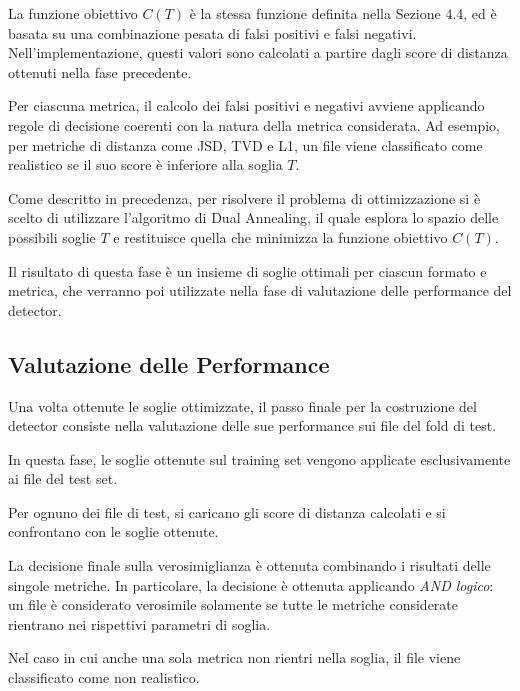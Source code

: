 \documentclass{report}
\begin{document}
La funzione obiettivo \(C(T)\) è la stessa funzione definita nella Sezione 4.4, ed è basata su una combinazione 
pesata di falsi positivi e falsi negativi. Nell'implementazione, questi valori sono calcolati 
a partire dagli score di distanza ottenuti nella fase precedente.

\bigskip

Per ciascuna metrica, il calcolo dei falsi positivi e negativi avviene applicando regole di decisione 
coerenti con la natura della metrica considerata. Ad esempio, per metriche di distanza come JSD, TVD e L1,
un file viene classificato come realistico se il suo score è inferiore alla soglia \(T\).

\bigskip

Come descritto in precedenza, per risolvere il problema di ottimizzazione si è scelto di utilizzare l'algoritmo di Dual Annealing,
il quale esplora lo spazio delle possibili soglie \(T\) e restituisce quella che minimizza la funzione obiettivo \(C(T)\).

\bigskip

Il risultato di questa fase è un insieme di soglie ottimali per ciascun formato e metrica,
che verranno poi utilizzate nella fase di valutazione delle performance del detector.




\subsection{Valutazione delle Performance}

Una volta ottenute le soglie ottimizzate, il passo finale per la costruzione del detector consiste nella valutazione delle sue performance
sui file del fold di test.

In questa fase, le soglie ottenute sul training set vengono applicate esclusivamente ai file del test set.

\bigskip

Per ognuno dei file di test, si caricano gli score di distanza calcolati e si confrontano con le soglie ottenute.

La decisione finale sulla verosimiglianza è ottenuta combinando i risultati delle singole metriche.
In particolare, la decisione è ottenuta applicando \emph{AND logico}: un file è considerato verosimile solamente se
tutte le metriche considerate rientrano nei rispettivi parametri di soglia.

Nel caso in cui anche una sola metrica non rientri nella soglia, il file viene classificato come non realistico.
\end{document}
